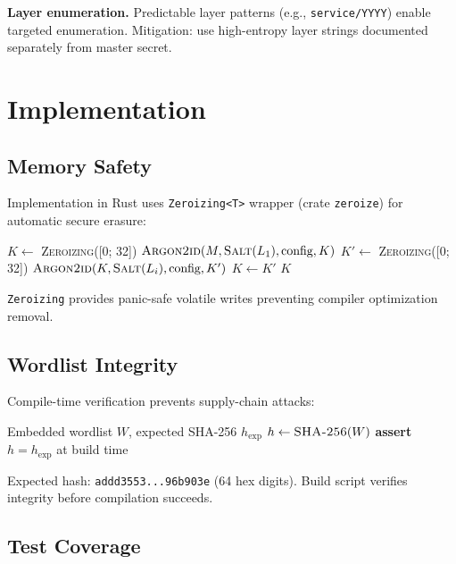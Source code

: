 \documentclass[11pt]{article}
\begin{document}
\textbf{Layer enumeration.} Predictable layer patterns (e.g., \texttt{service/YYYY}) enable targeted enumeration. Mitigation: use high-entropy layer strings documented separately from master secret.

\section{Implementation}

\subsection{Memory Safety}

Implementation in Rust uses \texttt{Zeroizing<T>} wrapper (crate \texttt{zeroize}) for automatic secure erasure:

\begin{algorithmic}[1]
    \State $K \gets$ \textsc{Zeroizing}([0; 32]) 
    \State $\textsc{Argon2id}(M, \textsc{Salt}(L_1), \text{config}, K)$
        \State $K' \gets$ \textsc{Zeroizing}([0; 32])
        \State $\textsc{Argon2id}(K, \textsc{Salt}(L_i), \text{config}, K')$
        \State $K \gets K'$ 
    \EndFor
    \State \Return $K$
\EndFunction
\end{algorithmic}

\texttt{Zeroizing} provides panic-safe volatile writes preventing compiler optimization removal.

\subsection{Wordlist Integrity}

Compile-time verification prevents supply-chain attacks:

\begin{algorithmic}[1]
\Require Embedded wordlist $W$, expected SHA-256 $h_{\text{exp}}$
\State $h \gets \textsc{SHA-256}(W)$
\State \textbf{assert} $h = h_{\text{exp}}$ at build time
\State {}
\end{algorithmic}

Expected hash: \texttt{addd3553...96b903e} (64 hex digits). Build script verifies integrity before compilation succeeds.

\subsection{Test Coverage}
\end{document}

